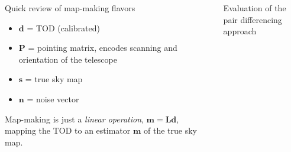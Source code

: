 \documentclass[final]{beamer}
\makeatletter
\newcommand\vb{\@ifstar\boldsymbol\mathbf}
\newcommand\vu[1]{%
\@ifstar{\hat{\boldsymbol{#1}}}{\hat{\mathbf{#1}}}}
\newlength{\sepwidth}
\newlength{\colwidth}
\newcommand{\separatorcolumn}{\begin{column}{\sepwidth}\end{column}}
\makeatother
\begin{document}
\begin{frame}[t]
\begin{columns}[t]
\begin{column}{\colwidth}
\begin{alertblock}{Quick review of map-making flavors}
        \begin{itemize}
          \item $\mathbf d$ = TOD (calibrated)
          \item $\mathbf P$ = pointing matrix, encodes scanning and orientation of the telescope
          \item $\mathbf s$ = true sky map
          \item $\mathbf n$ = noise vector
        \end{itemize}

        Map-making is just a \emph{linear operation}, \( \mathbf m = \mathbf{L d} \), mapping the TOD to an estimator $\mathbf m$ of the true sky map.







      \end{alertblock}

    \end{column}

    \separatorcolumn

    \begin{column}{\colwidth}

      \begin{block}{Evaluation of the pair differencing approach}


\end{block}
\end{column}
\end{columns}
\end{frame}
\end{document}
